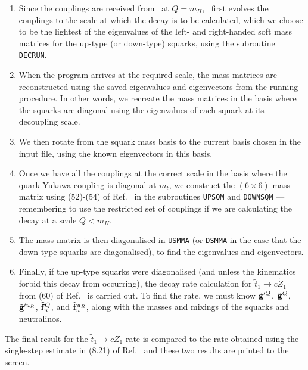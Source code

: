 \begin{enumerate}
\item Since the couplings are received from \progrge~at $Q=m_H$, \progstd~first evolves the couplings to the scale at which the decay is to be calculated, which we choose to be the lightest of the eigenvalues of the left- and right-handed soft mass matrices for the up-type (or down-type) squarks, using the subroutine \texttt{DECRUN}.
\item When the program arrives at the required scale, the mass matrices are reconstructed using the saved eigenvalues and eigenvectors from the running procedure. In other words, we recreate the mass matrices in the basis where the squarks are diagonal using the eigenvalues of each squark at its decoupling scale.
\item We then rotate from the squark mass basis to the current basis
chosen in the input file, using the known eigenvectors in this basis.

\item Once we have all the couplings at the correct scale in the basis where the quark Yukawa coupling is diagonal at $m_t$, we construct the $(6\times6)$ mass matrix using (52)-(54) of Ref.~\cite{RGE2} in the subroutines \texttt{UPSQM} and \texttt{DOWNSQM} \mbox{---} remembering to use the restricted set of couplings if we are calculating the decay at a scale $Q<m_{H}$.
\item The mass matrix is then diagonalised in \texttt{USMMA} (or
\texttt{DSMMA} in the case that the down-type squarks are diagonalised),
to find the eigenvalues and eigenvectors.

\item Finally, if the up-type squarks were diagonalised (and unless the kinematics forbid this decay from occurring), the decay rate calculation for $\tilde{t}_{1}\rightarrow c\tilde{Z}_1$ from (60) of Ref.~\cite{RGE2} is carried out. To find the rate, we must know $\tilde{\mathbf{g}}'^Q$, $\tilde{\mathbf{g}}^Q$, $\tilde{\mathbf{g}}'^{u_R}$, $\tilde{\mathbf{f}}^Q_u$, and $\tilde{\mathbf{f}}^{u_R}_u$, along with the masses and mixings of the squarks and neutralinos.
\end{enumerate}

The final result for the $\tilde{t}_{1}\rightarrow c\tilde{Z}_1$ rate is
compared to the rate obtained using the single-step estimate in (8.21)
of Ref.~\cite{diss} and these two results are printed to the screen.


